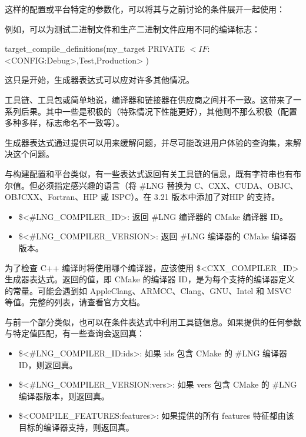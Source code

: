 这样的配置或平台特定的参数化，可以将其与之前讨论的条件展开一起使用：


例如，可以为测试二进制文件和生产二进制文件应用不同的编译标志：

\begin{cmake}
target_compile_definitions(my_target PRIVATE
    $<IF:$<CONFIG:Debug>,Test,Production>
)
\end{cmake}

这只是开始，生成器表达式可以应对许多其他情况。


工具链、工具包或简单地说，编译器和链接器在供应商之间并不一致。这带来了一系列后果。其中一些是积极的（特殊情况下性能更好），其他则不那么积极（配置多种多样，标志命名不一致等）。

生成器表达式通过提供可以用来缓解问题，并尽可能改进用户体验的查询集，来解决这个问题。

与构建配置和平台类似，有一些表达式返回有关工具链的信息，既有字符串也有布尔值。但必须指定感兴趣的语言（将 \#LNG 替换为 C、CXX、CUDA、OBJC、OBJCXX、Fortran、HIP 或 ISPC）。在 3.21 版本中添加了对HIP 的支持。

\begin{itemize}
\item
\$<\#LNG\_COMPILER\_ID>: 返回 \#LNG 编译器的 CMake 编译器 ID。

\item
\$<\#LNG\_COMPILER\_VERSION>: 返回 \#LNG 编译器的 CMake 编译器版本。
\end{itemize}

为了检查 C++ 编译时将使用哪个编译器，应该使用 \$<CXX\_COMPILER\_ID> 生成器表达式。返回的值，即 CMake 的编译器 ID，是为每个支持的编译器定义的常量。可能会遇到如 AppleClang、ARMCC、Clang、GNU、Intel 和 MSVC 等值。完整的列表，请查看官方文档。

与前一个部分类似，也可以在条件表达式中利用工具链信息。如果提供的任何参数与特定值匹配，有一些查询会返回真：

\begin{itemize}
\item
\$<\#LNG\_COMPILER\_ID:ids>: 如果 ids 包含 CMake 的 \#LNG 编译器 ID，则返回真。

\item
\$<\#LNG\_COMPILER\_VERSION:vers>: 如果 vers 包含 CMake 的 \#LNG 编译器版本，则返回真。

\item
\$<COMPILE\_FEATURES:features>: 如果提供的所有 features 特征都由该目标的编译器支持，则返回真。
\end{itemize}

